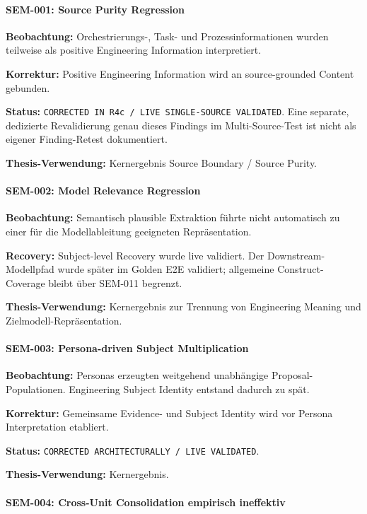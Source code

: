 \paragraph{SEM-001: Source Purity Regression}

\textbf{Beobachtung:}
Orchestrierungs-, Task- und Prozessinformationen wurden teilweise als positive
Engineering Information interpretiert.

\textbf{Korrektur:}
Positive Engineering Information wird an source-grounded Content gebunden.

\textbf{Status:}
\texttt{CORRECTED IN R4c / LIVE SINGLE-SOURCE VALIDATED}. Eine separate,
dedizierte Revalidierung genau dieses Findings im Multi-Source-Test ist nicht
als eigener Finding-Retest dokumentiert.

\textbf{Thesis-Verwendung:}
Kernergebnis Source Boundary / Source Purity.


\paragraph{SEM-002: Model Relevance Regression}

\textbf{Beobachtung:}
Semantisch plausible Extraktion führte nicht automatisch zu einer für die
Modellableitung geeigneten Repräsentation.

\textbf{Recovery:}
Subject-level Recovery wurde live validiert. Der Downstream-Modellpfad wurde
später im Golden E2E validiert; allgemeine Construct-Coverage bleibt über
SEM-011 begrenzt.

\textbf{Thesis-Verwendung:}
Kernergebnis zur Trennung von Engineering Meaning und Zielmodell-Repräsentation.


\paragraph{SEM-003: Persona-driven Subject Multiplication}

\textbf{Beobachtung:}
Personas erzeugten weitgehend unabhängige Proposal-Populationen. Engineering
Subject Identity entstand dadurch zu spät.

\textbf{Korrektur:}
Gemeinsame Evidence- und Subject Identity wird vor Persona Interpretation
etabliert.

\textbf{Status:}
\texttt{CORRECTED ARCHITECTURALLY / LIVE VALIDATED}.

\textbf{Thesis-Verwendung:}
Kernergebnis.


\paragraph{SEM-004: Cross-Unit Consolidation empirisch ineffektiv}

